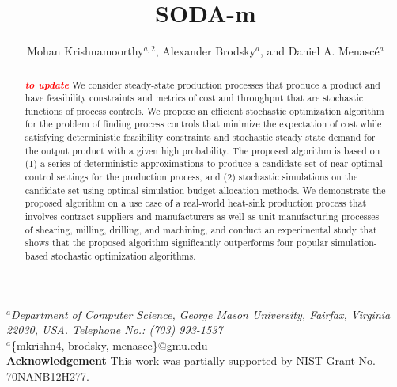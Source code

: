 \documentclass[a4paper, 12pt]{article} %
\title{\textbf{SODA-m} \mycomment{to update}} %
\author{Mohan Krishnamoorthy$^{a,2}$, Alexander Brodsky$^a$, and Daniel A. Menasc\'e$^{a}$} %
\makeatletter
\newcommand\mycomment[1]{\textcolor{red}{\textbf{\textit{(#1)}}}}
\newcommand\mycommentn[1]{\textcolor{red}{\textbf{\textit{#1}}}\newline}
\renewcommand{\maketitle}{ %
\begin{flushleft} 
{\large\@title\footnotemark[1]} %

\vspace{20pt} %

{\large\@author} %
\end{flushleft}
}
\makeatother
\begin{document}
\maketitle %

\begin{flushleft} 
\vspace{10pt}
$^a$\textit{Department of Computer Science, George Mason University, Fairfax, Virginia 22030, USA. Telephone No.: (703) 993-1537}\\
\vspace{20pt}
$^a$\{mkrishn4, brodsky, menasce\}@gmu.edu \\
\vspace{20pt}
\textbf{Acknowledgement}\newline
This work was partially supported by NIST Grant No. 70NANB12H277. \newline
\vspace{20pt}
\footnotetext[1]{Word Count: 6319 \mycomment{to update}}
\end{flushleft} 

\newpage
{\large \@title }
\vspace{10pt}


\begin{abstract}{\small\noindent
		\mycommentn{to update}
We consider steady-state production processes that produce a product and have feasibility constraints and metrics of cost and throughput that are stochastic functions of process controls. We propose an efficient stochastic optimization algorithm for the problem of finding process controls that minimize the expectation of cost while satisfying deterministic feasibility constraints and stochastic steady state demand for the output product with a given high probability. The proposed algorithm is based on (1) a series of deterministic approximations to produce a candidate set of near-optimal control settings for the production process, and (2) stochastic simulations on the candidate set using optimal simulation budget allocation methods. We demonstrate the proposed  algorithm on a use case of a real-world heat-sink production process that involves contract suppliers and manufacturers as well as unit manufacturing processes of shearing, milling, drilling, and machining, and conduct an experimental study that shows that the proposed algorithm significantly outperforms four popular simulation-based stochastic optimization algorithms.
}
\end{abstract}
\end{document}
